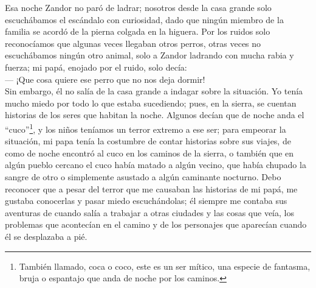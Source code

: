 Esa noche Zandor no paró de ladrar; nosotros desde la casa grande solo escuchábamos el escándalo con curiosidad, dado que ningún miembro de la familia se acordó de la pierna colgada en la higuera. Por los ruidos solo reconocíamos que algunas veces llegaban otros perros, otras veces no escuchábamos ningún otro animal, solo a Zandor ladrando con mucha rabia y fuerza; mi papá, enojado por el ruido, solo decía:\\\indent
--- ¡Que cosa quiere ese perro que no nos deja dormir!\\\indent
Sin embargo, él no salía de la casa grande a indagar sobre la situación. Yo tenía mucho miedo por todo lo que estaba sucediendo; pues, en la sierra, se cuentan historias de los seres que habitan la noche.
Algunos decían que de noche anda el ``cuco''\footnote{También llamado, coca o coco, este es un ser mítico, una especie de fantasma, bruja o espantajo que anda de noche por los caminos.}, y los niños teníamos un terror extremo a ese ser; para empeorar la situación, mi papa tenía la costumbre de contar historias sobre sus viajes, de como de noche encontró al cuco en los caminos de la sierra, o también que en algún pueblo cercano el cuco había matado a algún vecino, que había chupado la sangre de otro o simplemente asustado a algún caminante nocturno. Debo reconocer que a pesar del terror que me causaban las historias de mi papá, me gustaba conocerlas y pasar miedo escuchándolas; él siempre me contaba sus aventuras de cuando salía a trabajar a otras ciudades y las cosas que veía, los problemas que acontecían en el camino y de los personajes que aparecían cuando él se desplazaba a pié.

